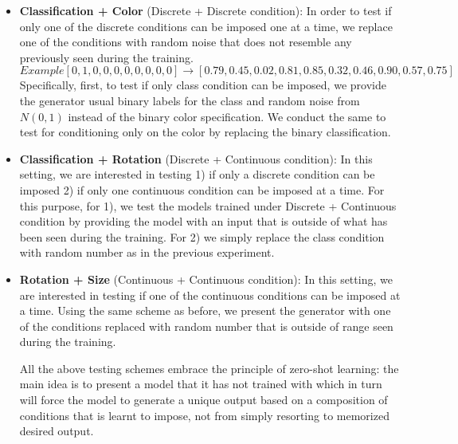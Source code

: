 \documentclass[11pt, letterpaper, oneside]{article}
\begin{document}
\begin{itemize}
    \item \textbf{Classification + Color} (Discrete + Discrete condition): In order to test if only one of the discrete conditions can be imposed one at a time, we replace one of the conditions with random noise that does not resemble any previously seen during the training.\newline
    \begin{equation*}
    Example
        [0, 1, 0, 0, 0, 0, 0, 0, 0, 0] \longrightarrow [0.79, 0.45, 0.02, 0.81, 0.85, 0.32, 0.46, 0.90, 0.57, 0.75]
    \end{equation*}
    Specifically, first, to test if only class condition can be imposed, we provide the generator usual binary labels for the class and random noise from $N(0,1)$ instead of the binary color specification. We conduct the same to test for conditioning only on the color by replacing the binary classification.
    
    \item \textbf{Classification + Rotation} (Discrete + Continuous condition): In this setting, we are interested in testing 1) if only a discrete condition can be imposed 2) if only one continuous condition can be imposed at a time. \newline
    For this purpose, for 1), we test the models trained under Discrete + Continuous condition by providing the model with an input that is outside of what has been seen during the training. \newline
    For 2) we simply replace the class condition with random number as in the previous experiment.

    \item \textbf{Rotation + Size} (Continuous + Continuous condition): In this setting, we are interested in testing if one of the continuous conditions can be imposed at a time. \newline
    Using the same scheme as before, we present the generator with one of the conditions replaced with random number that is outside of range seen during the training. 

All the above testing schemes embrace the principle of zero-shot learning: the main idea is to present a model that it has not trained with which in turn will force the model to generate a unique output based on a composition of conditions that is learnt to impose, not from simply resorting to memorized desired output. 

\end{itemize} 
\end{document}
